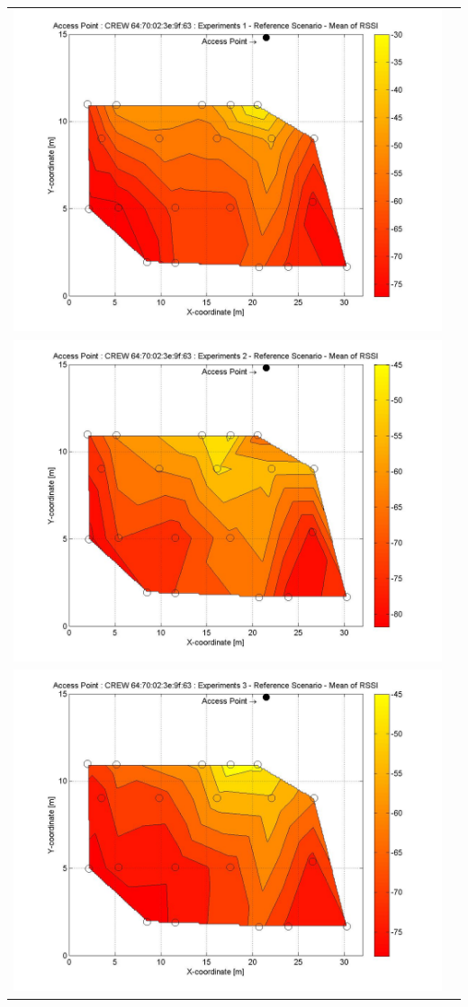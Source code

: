 \documentclass[11pt,a4paper,headinclude,footinclude,chapterprefix=on]{scrreprt}
\begin{document}
\begin{longtable}
	{lr} 
	\includegraphics[width=13cm]{../../Source/plot/CREW_63/63_Ref_Ex_1_Mean.jpg} \\
	\includegraphics[width=13cm]{../../Source/plot/CREW_63/63_Ref_Ex_2_Mean.jpg} \\
	\includegraphics[width=13cm]{../../Source/plot/CREW_63/63_Ref_Ex_3_Mean.jpg} \\

\end{longtable}
\end{document}
